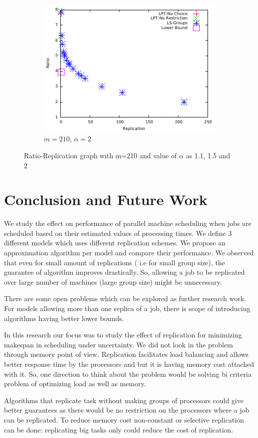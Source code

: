\documentclass[10pt, conference, compsocconf]{IEEEtran}
\begin{document}
\begin {figure}
\begin{subfigure}[b]{0.5\textwidth}
     \includegraphics[width=\textwidth]{alpha_2.pdf}
     \caption{$m=210$, $\alpha=2$}
      \label{fig:3}
\end {subfigure} %


\caption{Ratio-Replication graph with m=210 and value of $\alpha$ as 1.1, 1.5 and 2}
\label{fig:Graph}
\end {figure}

\section{Conclusion and Future Work}\label{sec8}

We study the effect on performance of parallel machine scheduling when
jobs are scheduled based on their estimated values of processing
times.  We define 3 different models which uses different replication
schemes.  We propose an approximation algorithm per model and compare
their performance. We observed that even for small amount of
replications ( i.e for small group size), the guarantee of algorithm
improves drastically. So, allowing a job to be replicated over large
number of machines (large group size) might be unnecessary.

There are some open problems which can be explored as further research
work. For models allowing more than one replica of a job, there is
scope of introducing algorithms having better lower bounds.

In this research our focus was to study the effect of replication for
minimizing makespan in scheduling under uncertainty. We did not look
in the problem through memory point of view. Replication facilitates
load balancing and allows better response time by the processors and
but it is having memory cost attached with it. So, one direction to
think about the problem would be solving bi criteria problem of
optimizing load as well as memory.
 
Algorithms that replicate task without making groups of processors
could give better guarantees as there would be no restriction on the
processors where a job can be replicated. To reduce memory cost
non-constant or selective replication can be done: replicating big
tasks only could reduce the cost of replication.



 
\end{document}
